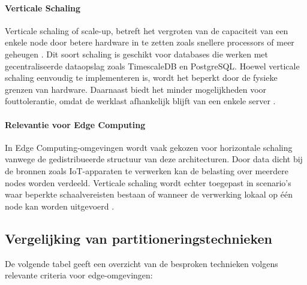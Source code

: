 \paragraph{Verticale Schaling}
Verticale schaling of scale-up, betreft het vergroten van de capaciteit van een enkele node door betere hardware in te zetten zoals snellere processors of meer geheugen \autocite{Ponnusamy2024}. 
Dit soort schaling is geschikt voor databases die werken met gecentraliseerde dataopslag zoals TimescaleDB en PostgreSQL. 
Hoewel verticale schaling eenvoudig te implementeren is, wordt het beperkt door de fysieke grenzen van hardware. 
Daarnaast biedt het minder mogelijkheden voor fouttolerantie, omdat de werklast afhankelijk blijft van een enkele server \autocite{Mahmud2020}.

\paragraph{Relevantie voor Edge Computing}
In Edge Computing-omgevingen wordt vaak gekozen voor horizontale schaling vanwege de gedistribueerde structuur van deze architecturen. 
Door data dicht bij de bronnen zoals IoT-apparaten te verwerken kan de belasting over meerdere nodes worden verdeeld. 
Verticale schaling wordt echter toegepast in scenario's waar beperkte schaalvereisten bestaan of wanneer de verwerking lokaal op één node kan worden uitgevoerd \autocite{Kleppmann2017}.

\subsection{Vergelijking van partitioneringstechnieken}
De volgende tabel geeft een overzicht van de besproken technieken volgens relevante criteria voor edge-omgevingen:

